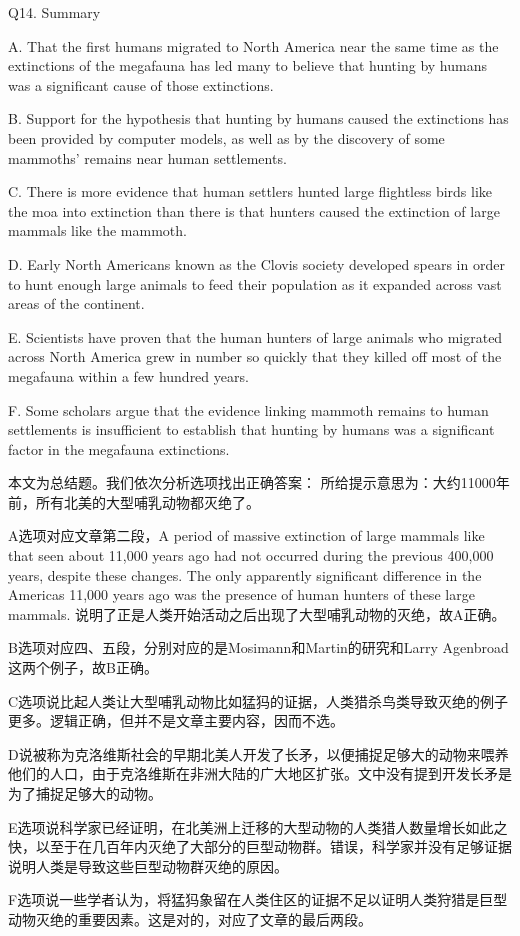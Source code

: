 \begin{blk}
    \begin{qst}
        Q14. Summary
    \end{qst}

    \begin{chc}
        A. That the first humans migrated to North America near the same time as the extinctions of the megafauna has led many to believe that hunting by humans was a significant cause of those extinctions.

        B. Support for the hypothesis that hunting by humans caused the extinctions has been provided by computer models, as well as by the discovery of some mammoths' remains near human settlements.

        C. There is more evidence that human settlers hunted large flightless birds like the moa into extinction than there is that hunters caused the extinction of large mammals like the mammoth.

        D. Early North Americans known as the Clovis society developed spears in order to hunt enough large animals to feed their population as it expanded across vast areas of the continent.

        E. Scientists have proven that the human hunters of large animals who migrated across North America grew in number so quickly that they killed off most of the megafauna within a few hundred years.

        F. Some scholars argue that the evidence linking mammoth remains to human settlements is insufficient to establish that hunting by humans was a significant factor in the megafauna extinctions.
    \end{chc}

    \begin{nlz}
        本文为总结题。我们依次分析选项找出正确答案： 所给提示意思为：大约11000年前，所有北美的大型哺乳动物都灭绝了。

        A选项对应文章第二段，A period of massive extinction of large mammals like that seen about 11,000 years ago had not occurred during the previous 400,000 years, despite these changes. The only apparently significant difference in the Americas 11,000 years ago was the presence of human hunters of these large mammals. 说明了正是人类开始活动之后出现了大型哺乳动物的灭绝，故A正确。

        B选项对应四、五段，分别对应的是Mosimann和Martin的研究和Larry Agenbroad这两个例子，故B正确。

        C选项说比起人类让大型哺乳动物比如猛犸的证据，人类猎杀鸟类导致灭绝的例子更多。逻辑正确，但并不是文章主要内容，因而不选。

        D说被称为克洛维斯社会的早期北美人开发了长矛，以便捕捉足够大的动物来喂养他们的人口，由于克洛维斯在非洲大陆的广大地区扩张。文中没有提到开发长矛是为了捕捉足够大的动物。

        E选项说科学家已经证明，在北美洲上迁移的大型动物的人类猎人数量增长如此之快，以至于在几百年内灭绝了大部分的巨型动物群。错误，科学家并没有足够证据说明人类是导致这些巨型动物群灭绝的原因。

        F选项说一些学者认为，将猛犸象留在人类住区的证据不足以证明人类狩猎是巨型动物灭绝的重要因素。这是对的，对应了文章的最后两段。
    \end{nlz}
\end{blk}
